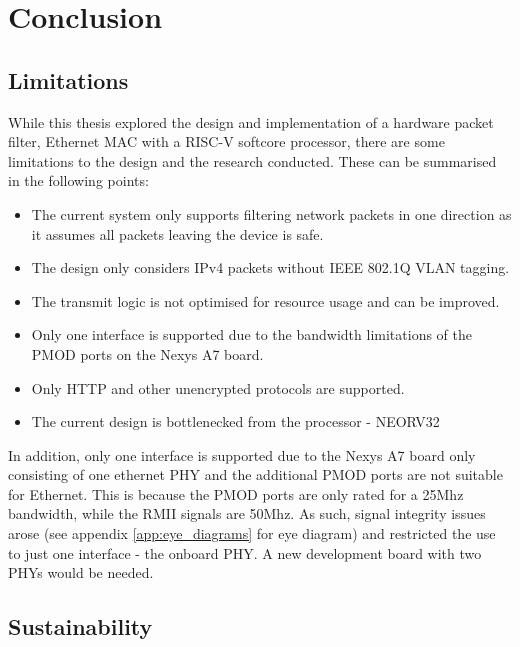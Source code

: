 \chapter[Conclusion]{Conclusion}
\label{Chap:Conclusion}


\section{Limitations}
While this thesis explored the design and implementation of a hardware packet filter, Ethernet MAC with a RISC-V softcore processor, there are some limitations to the design and the research conducted. These can be summarised in the following points:


\begin{itemize}
    \item The current system only supports filtering network packets in one direction as it assumes all packets leaving the device is safe. 
    \item The design only considers IPv4 packets without IEEE 802.1Q VLAN tagging.
    \item The transmit logic is not optimised for resource usage and can be improved.
    \item Only one interface is supported due to the bandwidth limitations of the PMOD ports on the Nexys A7 board.
    \item Only HTTP and other unencrypted protocols are supported.
    \item The current design is bottlenecked from the processor - NEORV32
\end{itemize}


In addition, only one interface is supported due to the Nexys A7 board only consisting of one ethernet PHY and the additional PMOD ports are not suitable for Ethernet. This is because the PMOD ports are only rated for a 25Mhz bandwidth, while the RMII signals are 50Mhz. As such, signal integrity issues arose (see appendix \ref{app:eye_diagrams} for eye diagram) and restricted the use to just one interface - the onboard PHY. A new development board with two PHYs would be needed.











\section{Sustainability}




